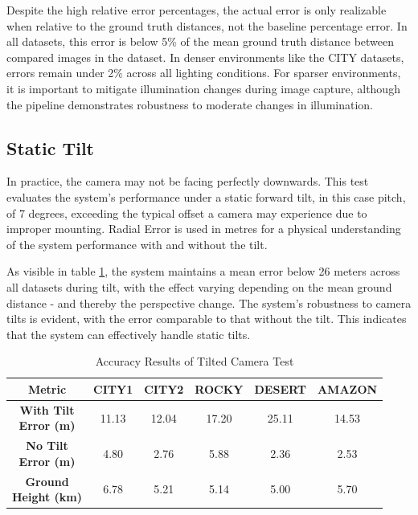 Despite the high relative error percentages, the actual error is only realizable when relative to the ground truth distances, not the baseline percentage error. In all datasets, this error is below 5\% of the mean ground truth distance between compared images in the dataset. In denser environments like the CITY datasets, errors remain under 2\% across all lighting conditions. For sparser environments, it is important to mitigate illumination changes during image capture, although the pipeline demonstrates robustness to moderate changes in illumination.


\subsection{Static Tilt}
In practice, the camera may not be facing perfectly downwards. This test evaluates the system's performance under a static forward tilt, in this case pitch, of 7 degrees, exceeding the typical offset a camera may experience due to improper mounting. Radial Error is used in metres for a physical understanding of the system performance with and without the tilt.

As visible in table \ref{tab:tilted_camera}, the system maintains a mean error below 26 meters across all datasets during tilt, with the effect varying depending on the mean ground distance - and thereby the perspective change. The system's robustness to camera tilts is evident, with the error comparable to that without the tilt. This indicates that the system can effectively handle static tilts.

\begin{table}
    \centering
    \caption{Accuracy Results of Tilted Camera Test}
    \label{tab:tilted_camera}
    \begin{tabular}{|c|c|c|c|c|c|}
    \hline
    \textbf{Metric} & \textbf{CITY1} & \textbf{CITY2} & \textbf{ROCKY} & \textbf{DESERT} & \textbf{AMAZON} \\ \hline
    \makecell{\textbf{With Tilt} \\ \textbf{Error (m)}} & 11.13 & 12.04 & 17.20 & 25.11 & 14.53 \\ \hline
    \makecell{\textbf{No Tilt} \\ \textbf{Error (m)}} & 4.80 & 2.76 & 5.88 & 2.36 & 2.53 \\ \hline
    \makecell{\textbf{Ground} \\ \textbf{Height (km)}} & 6.78 & 5.21 & 5.14 & 5.00 & 5.70 \\ \hline
    \end{tabular}

\end{table}



